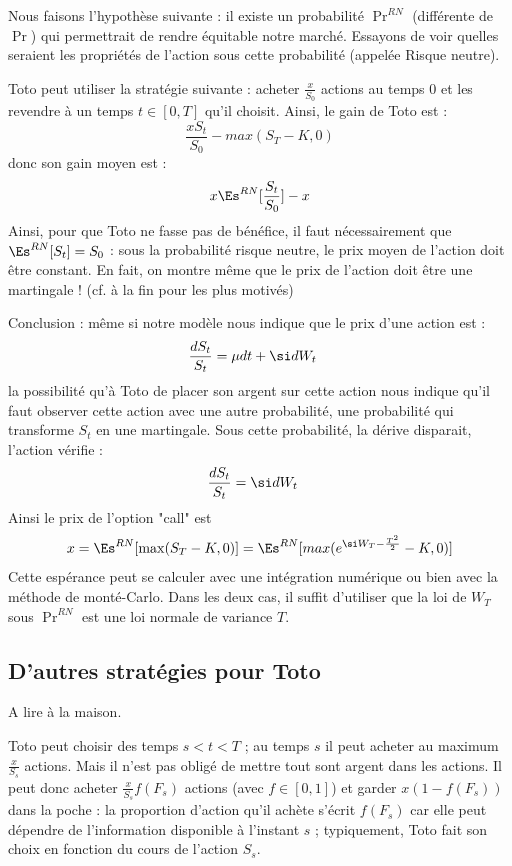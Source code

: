 \documentclass{article}
\begin{document}
  Nous faisons l'hypothèse suivante : il existe un probabilité $\Pr^{RN}$ (différente de $\Pr$) qui permettrait de rendre équitable notre marché. Essayons de voir quelles seraient les propriétés de l'action sous cette probabilité (appelée Risque neutre). 
   

 Toto peut utiliser la stratégie suivante :  acheter $\frac x {S_0}$ actions au temps $0$ et les revendre à un temps $t\in [0,T]$ qu'il choisit. Ainsi, le gain de Toto est : 
$$
\frac {xS_{t}} {S_{0}} - max(S_T -K,0)
$$
donc son gain moyen est :
$$
x \Es^{RN} [ \frac {S_t}{S_0}  ]  -x 
$$
Ainsi, pour que Toto ne fasse pas de bénéfice, il faut nécessairement que $\Es^{RN}[S_t] = S_0$ :  sous la probabilité risque neutre, le prix moyen de l'action doit être constant.  En fait, on montre même que le prix de l'action doit être une martingale !  (cf. à la fin pour les plus motivés)


\bigskip 

Conclusion :  même si notre modèle nous indique que le prix d'une action est : 
 \begin{alignat}{1} 
 \frac{d S_t}{S_t}  &=    \mu  dt +   \si   d W_t  
\end{alignat}
la possibilité qu'à Toto de placer son argent sur cette action nous indique qu'il faut observer cette action avec une autre probabilité, une probabilité qui transforme $S_t$ en une martingale. Sous cette probabilité, la dérive disparait, l'action vérifie :
 \begin{alignat}{1} 
 \frac{d S_t}{S_t}  &=   \si   d W_t  
\end{alignat}
Ainsi le prix de l'option "call" est
$$
x= \Es^{RN}[ \max( S_T - K,0) ]  =  \Es^{RN}[ max( e^{\si W_T - \frac {T^2} 2} - K,0) ] 
$$
Cette espérance peut se calculer avec une intégration numérique ou bien avec la méthode de monté-Carlo. Dans les deux cas, il suffit d'utiliser que la loi de $W_T$ sous $\Pr^{RN}$ est une loi normale de variance $T$. 




\subsection{D'autres stratégies pour Toto}

A lire à la maison. 

 Toto peut  choisir des temps $s<t<T$ ; au temps $s$ il peut acheter au maximum $\frac{x}{S_s} $ actions. Mais il n'est pas obligé de mettre tout sont argent dans les actions. Il peut donc acheter $\frac{x}{S_s} f(F_s) $  actions (avec $f\in[0,1]$) et garder $x (1 - f(F_s))$ dans la poche : la proportion d'action qu'il achète  s'écrit $f(F_s)$ car elle peut dépendre de l'information disponible à l'instant $s$ ; typiquement, Toto fait son choix en fonction du cours de l'action $S_s$.      
 
\end{document}
